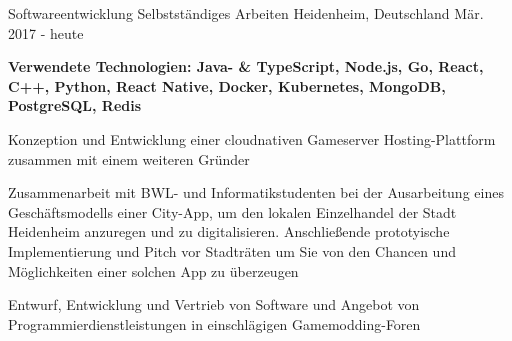 \begin{cventries}

  \cventry
    {Softwareentwicklung} %
    {\faUser{} Selbstständiges Arbeiten} %
    {Heidenheim, Deutschland} %
    {Mär. 2017 - heute} %
    {
      \begin{cvitems} %
        {\scriptsize\textbf{Verwendete Technologien: Java- \& TypeScript, Node.js, Go, React, C++, Python, React Native, Docker, Kubernetes, MongoDB,\\ PostgreSQL, Redis}}
        \item {}
        \item {Konzeption und Entwicklung einer cloudnativen Gameserver Hosting-Plattform zusammen mit einem weiteren Gründer}
        \item {Zusammenarbeit mit BWL- und Informatikstudenten bei der Ausarbeitung eines Geschäftsmodells einer City-App, um den lokalen Einzelhandel der Stadt Heidenheim
        anzuregen und zu digitalisieren. Anschließende prototyische Implementierung und Pitch vor Stadträten um Sie von den Chancen und Möglichkeiten einer solchen App zu überzeugen}
        \item {Entwurf, Entwicklung und Vertrieb von Software und Angebot von Programmierdienstleistungen in einschlägigen Gamemodding-Foren}
      \end{cvitems}
    }

\end{cventries}

